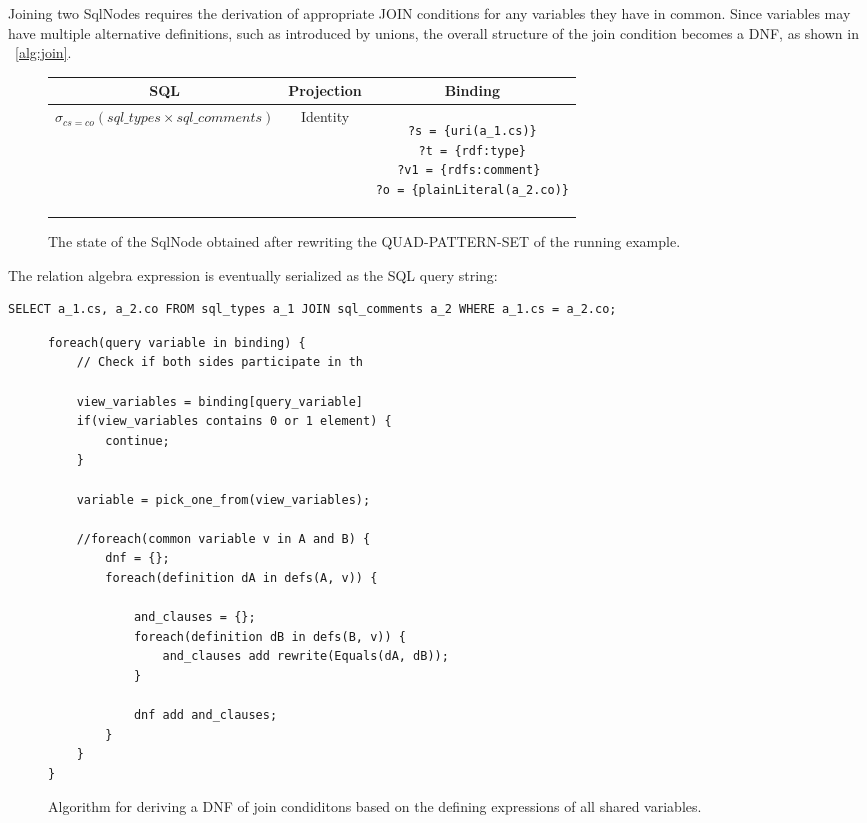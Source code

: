 \documentclass[a4paper,twoside,bibtotoc,abstracton,12pt,BCOR=15mm]{scrreprt}
\begin{document}
Joining two SqlNodes requires the derivation of appropriate JOIN conditions for any variables they have in common.
Since variables may have multiple alternative definitions, such as introduced by unions, the overall structure of
the join condition becomes a DNF, as shown in ~\autoref{alg:join}.


\begin{figure}[!h]
\begin{tabular}{ccc}
\toprule
SQL & Projection & Binding \\
\midrule

$\sigma_{cs = co} \left ( sql\_types \times sql\_comments \right )$

&

Identity

&

\begin{minipage}{5cm}
\begin{scriptsize}
\begin{verbatim}
?s = {uri(a_1.cs)}
?t = {rdf:type}
?v1 = {rdfs:comment} 
?o = {plainLiteral(a_2.co)}
\end{verbatim} 
\end{scriptsize}
\end{minipage}

\\
\bottomrule
\end{tabular}
\caption{The state of the SqlNode obtained after rewriting the QUAD-PATTERN-SET of the running example.}
\end{figure}

The relation algebra expression is eventually serialized as the SQL query string:
\begin{lstlisting}
SELECT a_1.cs, a_2.co FROM sql_types a_1 JOIN sql_comments a_2 WHERE a_1.cs = a_2.co;
\end{lstlisting}



\begin{figure}
\begin{lstlisting} 
foreach(query variable in binding) {
    // Check if both sides participate in th

    view_variables = binding[query_variable]
    if(view_variables contains 0 or 1 element) { 
        continue;
    }
    
    variable = pick_one_from(view_variables);
     
	//foreach(common variable v in A and B) {
		dnf = {};
	    foreach(definition dA in defs(A, v)) {
	    
	    	and_clauses = {};
	    	foreach(definition dB in defs(B, v)) {
	    		and_clauses add rewrite(Equals(dA, dB));
	    	}
	    	
	    	dnf add and_clauses;
	    }
	}
}
\end{lstlisting}
\caption{Algorithm for deriving a DNF of join condiditons based on the defining expressions of all shared variables.}
\label{alg:join}
\end{figure}
\end{document}
